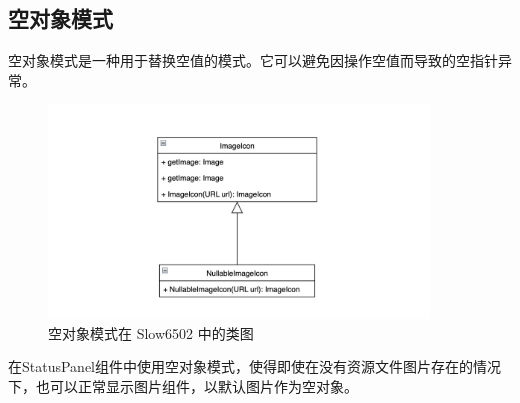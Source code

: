 \subsection{空对象模式}

空对象模式是一种用于替换空值的模式。它可以避免因操作空值而导致的空指针异常。

\begin{figure}[htb]
  \centering
  \includegraphics[width=0.9\textwidth]{figures/空对象模式.jpg}
  \caption{空对象模式在 Slow6502 中的类图}
\end{figure}

在StatusPanel组件中使用空对象模式，使得即使在没有资源文件图片存在的情况下，也可以正常显示图片组件，以默认图片作为空对象。


